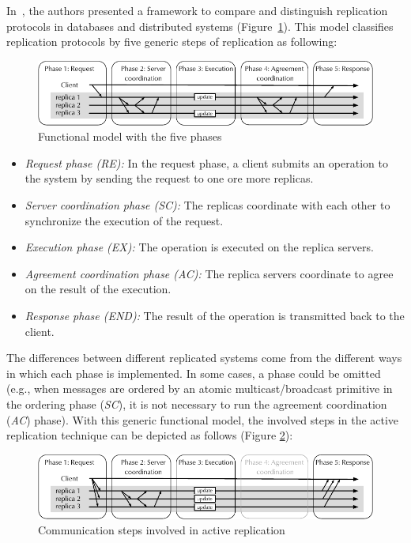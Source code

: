 In~\cite{pedone:replication}, the authors presented a
framework to compare and distinguish replication protocols in databases
and distributed systems (Figure~\ref{fig:replication:org}). This model
classifies replication protocols by five generic steps of replication as
following:

\begin{figure}[ht!]
  \begin{minipage}[b]{1.0\linewidth}
  \centering
        \includegraphics[width=1\linewidth]{figures/replication-original}
  \end{minipage}
  \caption{Functional model with the five phases}
  \label{fig:replication:org}
\end{figure}

\begin{itemize}
  \item \textit{Request phase (RE):} In the request phase, a client submits an
     operation to the system by sending the request to one ore more replicas.
  \item \textit{Server coordination phase (SC):} The replicas coordinate
  with each other to synchronize the execution of the request.
  \item \textit{Execution phase (EX):} The operation is executed on the replica servers.
  \item \textit{Agreement coordination phase (AC):} The replica servers
  coordinate to agree on the result of the execution.
  \item \textit{Response phase (END):} The result of the operation is
  transmitted back to the client.
\end{itemize}

The differences between different replicated systems come from the different
ways in which each phase is implemented. In some cases, a phase could be omitted (e.g.,
when messages are ordered by an atomic multicast/broadcast primitive in the
ordering phase (\emph{SC}), it is not necessary to run the agreement
coordination (\emph{AC}) phase). With this generic functional model, the
involved steps in the active replication technique can be depicted as follows
(Figure \ref{fig:replication:active}):

\begin{figure}[ht!]
  \begin{minipage}[b]{1.0\linewidth}
  \centering
        \includegraphics[width=1\linewidth]{figures/replication-active}
  \end{minipage}
  \caption{Communication steps involved in active replication}
  \label{fig:replication:active}
\end{figure}

